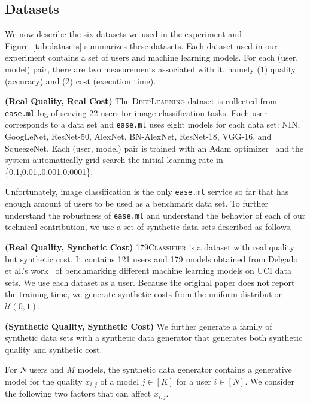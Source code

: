 \documentclass[letterpaper]{vldb}
\newcommand{\eml}{\texttt{ease.ml}\xspace}
\begin{document}
\subsection{Datasets}

We now describe the six datasets we used
in the experiment and Figure~\ref{tab:datasets} summarizes these datasets.
Each dataset used in our experiment 
contains a set of users and machine
learning models. For each (user, model)
pair, there are two measurements
associated with it, namely (1) quality
(accuracy) and (2) cost
(execution time).

\vspace{0.5em}
\noindent
{\bf (Real Quality, Real Cost)} The 
\textsc{DeepLearning} dataset is collected
from \eml log of serving 22 users 
for image classification tasks. Each
user corresponds to a data set and
\eml uses eight models for
each data set:
NIN, GoogLeNet, ResNet-50, AlexNet, BN-AlexNet, ResNet-18, VGG-16, and SqueezeNet.
Each (user, model) pair is trained with
an Adam optimizer~\cite{XX} and the
system automatically grid search 
the initial learning rate in
\{0.1,0.01,.0.001,0.0001\}.

\vspace{0.5em}
Unfortunately, image classification 
is the only \eml service so far that
has enough amount of users
to be used as a benchmark data set.
To further understand the robustness
of \eml and understand the
behavior of each of our technical
contribution, we use a set
of synthetic data sets described
as follows.

\vspace{0.5em}
\noindent
{\bf (Real Quality, Synthetic Cost)} 
\textsc{179Classifier}
is a dataset with real quality 
but synthetic cost. It contains
121 users and 179 models obtained from
Delgado et al.'s work~\cite{DelgadoCBA14}
of benchmarking different machine
learning models on UCI data sets.
We use each dataset as a user.
Because the original paper does not
report the training time, we 
generate synthetic costs from the uniform distribution $\mathcal{U}(0, 1)$.

\vspace{0.5em}
\noindent
{\bf (Synthetic Quality, Synthetic Cost)}
We further generate a family of 
synthetic data sets with a 
synthetic data generator that generates
both synthetic quality and synthetic cost.

For $N$ users and $M$ models, the synthetic
data generator contains a generative model 
for the quality $x_{i,j}$ of a 
model $j\in[K]$ for a user $i\in[N]$.
We consider the following two factors that can affect $x_{i,j}$.
\end{document}
